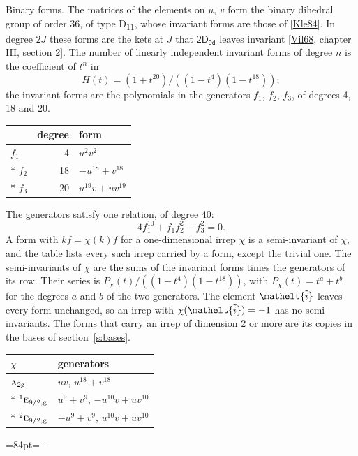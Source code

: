 \documentclass[10pt,a4paper]{article}
\makeatletter
\renewcommand\paragraph{\@startsection{paragraph}{4}{\z@}{1.5ex plus .5ex minus .2ex}{-1em}%
  {\normalfont\small\sffamily\bfseries\color{parttitle}}}
\newcommand{\needspace}[1]{\par\penalty-100\begingroup\dimen0=#1\relax\dimen2=\pagegoal
  \advance\dimen2-\pagetotal\ifdim\dimen0>\dimen2\relax\ifdim\dimen2>0pt\vfil\break\fi\fi
  \endgroup}
\numberwithin{equation}{section}
\newcommand{\eltfont}[1]{{\let\sigma\eltsigma\mathelt{#1}}}
\newcommand{\grp}[1]{\mathsf{#1}}
\newcommand{\irr}[1]{\text{\normalfont\scshape #1}}
\newcommand{\conjpair}[1]{{}^{#1}}
\newcommand{\elt}[1]{\eltfont{#1}}
\newcommand{\ptag}[1]{\mathrm{#1}}
\newcommand{\lift}[1]{\tilde{#1}}
\makeatother
\begin{document}
\paragraph{Binary forms.}
The matrices of the elements on $u$, $v$ form the binary dihedral group of order 36, of type D\textsubscript{11}, whose invariant forms are those of [\href{../../../REFERENCES.pdf\#ref.Kle84}{Kle84}]. In degree $2J$ these forms are the kets at $J$ that $\grp{2D_{9d}}$ leaves invariant [\href{../../../REFERENCES.pdf\#ref.Vil68}{Vil68}, chapter III, section 2]. \label{n:head.degree}\label{n:head.form}The number of linearly independent invariant forms of degree $n$ is the coefficient of $t^n$ in
\begin{equation}\label{e:molien}H(t) = (1 + t^{20})/((1-t^{4})(1-t^{18}));\end{equation}
the invariant forms are the polynomials in the generators $f_1$, $f_2$, $f_3$, of degrees 4, 18 and 20.
{\small\begin{longtable}{@{}lrl@{}}\toprule
& degree & form\\\midrule\endhead
\bottomrule\endfoot\endlastfoot
$f_{1}$ & 4 & $u^{2}v^{2}$\\*
$f_{2}$ & 18 & $-u^{18} + v^{18}$\\*
$f_{3}$ & 20 & $u^{19}v + uv^{19}$\\
\bottomrule\end{longtable}}
The generators satisfy one relation, of degree 40:
\begin{equation}\label{e:relation}4f_{1}^{10} + f_{1}f_{2}^{2} - f_{3}^{2} = 0.\end{equation}
A form with $k f = \chi(k) f$ for a one-dimensional irrep $\chi$ is a semi-invariant of $\chi$, and the table lists every such irrep carried by a form, except the trivial one. \label{n:head.generators}The semi-invariants of $\chi$ are the sums of the invariant forms times the generators of its row. Their series is $P_\chi(t)/((1-t^{4})(1-t^{18}))$, with $P_\chi(t) = t^{a} + t^{b}$ for the degrees $a$ and $b$ of the two generators. The element $\elt{\lift{i}}$ leaves every form unchanged, so an irrep with $\chi(\elt{\lift{i}}) = -1$ has no semi-invariants. The forms that carry an irrep of dimension 2 or more are its copies in the bases of section~\ref{s:bases}.
{\small\begin{longtable}{@{}ll@{}}\toprule
$\chi$ & generators\\\midrule\endhead
\bottomrule\endfoot\endlastfoot
$\irr{a}_{2\ptag{g}}$ & $uv$, $u^{18} + v^{18}$\\*
$\conjpair{1}\irr{e}_{9/2,\ptag{g}}$ & $u^{9} + v^{9}$, $-u^{10}v + uv^{10}$\\*
$\conjpair{2}\irr{e}_{9/2,\ptag{g}}$ & $-u^{9} + v^{9}$, $u^{10}v + uv^{10}$\\
\bottomrule\end{longtable}}
\needspace{84pt}
\end{document}
